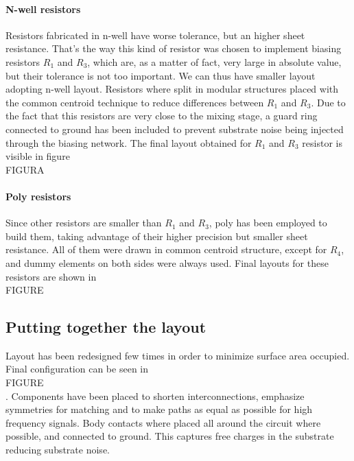 \paragraph{N-well resistors}
Resistors fabricated in n-well have worse tolerance, but an higher sheet resistance. That's the way this kind of resistor was chosen to implement biasing resistors \(R_1\) and \(R_3\), which are, as a matter of fact, very large in absolute value, but their tolerance is not too important. We can thus have smaller layout adopting n-well layout. Resistors where split in modular structures placed with the common centroid technique to reduce differences between \(R_1\) and \(R_3\). Due to the fact that this resistors are very close to the mixing stage, a guard ring connected to ground has been included to prevent substrate noise being injected through the biasing network. The final layout obtained for \(R_1\) and \(R_3\) resistor is visible in figure \\FIGURA\\

\paragraph{Poly resistors}
Since other resistors are smaller than \(R_1\) and \(R_3\), poly has been employed to build them, taking advantage of their higher precision but smaller sheet resistance. All of them were drawn in common centroid structure, except for \(R_4\), and dummy elements on both sides were always used. Final layouts for these resistors are shown in \\FIGURE\\

\subsection{Putting together the layout}
Layout has been redesigned few times in order to minimize surface area occupied. Final configuration can be seen in \\FIGURE\\. Components have been placed to shorten interconnections, emphasize symmetries for matching and to make paths as equal as possible for high frequency signals.
Body contacts where placed all around the circuit where possible, and connected to ground. This captures free charges in the substrate reducing substrate noise.